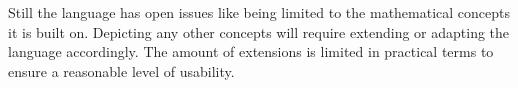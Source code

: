 \documentclass[twoside, openright, 12pt]{book}
\begin{document}
Still the language has open issues like being limited to the mathematical concepts it is built on.
Depicting any other concepts will require extending or adapting the language accordingly.
The amount of extensions is limited in practical terms to ensure a reasonable level of usability.








\cleardoublepage
\DeclareRobustCommand{\citeext}[1]{\citeauthor{#1}~\cite{#1}}




\end{document}
